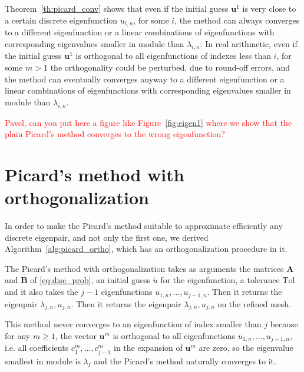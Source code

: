\documentclass[preprint ,12pt]{elsarticle}
\begin{document}
Theorem~\ref{th:picard_conv} shows that even if the initial guess $\mathbf{u}^1$ is very close to a certain discrete eigenfunction $u_{i,n}$, for some $i$, the method can always converges to a different eigenfunction or a linear combinations of eigenfunctions with corresponding eigenvalues smaller in module than $\lambda_{i,n}$. In real arithmetic, even if the initial guess $\mathbf{u}^1$ is orthogonal to all eigenfunctions of indexes less than $i$, for some $m>1$ the orthogonality could be perturbed, due to round-off errors, and the method can eventually converges anyway to a different eigenfunction or a linear combinations of eigenfunctions with corresponding eigenvalues smaller in module than $\lambda_{i,n}$.

\textcolor{red}{Pavel, can you put here a figure like Figure~\ref{fig:eigen1} where we show that the plain Picard's method converges to the wrong eigenfunction?}


\section{Picard's method with orthogonalization}

In order to make the Picard's method suitable to approximate efficiently any discrete eigenpair, and not only the first one, we derived Algorithm~\ref{alg:picard_ortho}, which has an orthogonalization procedure in it.

The Picard's method with orthogonalization takes as arguments the matrices $\mathbf{A}$ and $\mathbf{B}$ of \eqref{eq:disc_prob}, an initial guess $\tilde u$ for the eigenfunction, a tolerance $\mathrm{Tol}$and it also takes the $j-1$ eigenfunctions $u_{1,n},\dots,u_{j-1,n}$.
Then it returns the eigenpair $\lambda_{j,n},u_{j,n}$. 
Then it returns the eigenpair $\lambda_{j,n},u_{j,n}$ on the refined mesh.

This method never converges to an eigenfunction of index smaller than $j$ because for any $m\ge 1$, the vector $\mathbf{u}^m$ is orthogonal to all eigenfunctions $u_{1,n},\dots,u_{j-1,n}$, i.e. all coefficients 
$c_1^m,\dots,c_{j-1}^m$ in the expansion of $\mathbf{u}^m$ are zero, so the eigenvalue smallest in module is $\lambda_j$ and the Picard's method naturally converges to it.

\end{document}
